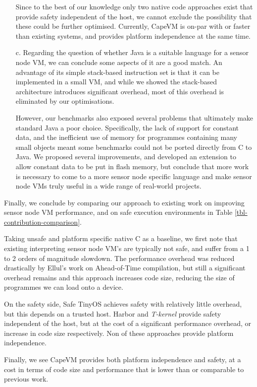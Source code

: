 \begin{enumerate}
	Since to the best of our knowledge only two native code approaches exist that provide safety independent of the host, we cannot exclude the possibility that these could be further optimised. Currently, CapeVM is on-par with or faster than existing systems, and provides platform independence at the same time.

	\item[c.]
	Regarding the question of whether Java is a suitable language for a sensor node VM, we can conclude some aspects of it are a good match. An advantage of its simple stack-based instruction set is that it can be implemented in a small VM, and while we showed the stack-based architecture introduces significant overhead, most of this overhead is eliminated by our optimisations.
	
	However, our benchmarks also exposed several problems that ultimately make standard Java a poor choice. Specifically, the lack of support for constant data, and the inefficient use of memory for programmes containing many small objects meant some benchmarks could not be ported directly from C to Java. We proposed several improvements, and developed an extension to allow constant data to be put in flash memory, but conclude that more work is necessary to come to a more sensor node specific language and make sensor node VMs truly useful in a wide range of real-world projects.
\end{enumerate}



Finally, we conclude by comparing our approach to existing work on improving sensor node VM performance, and on safe execution environments in Table \ref{tbl-contribution-comparison}.

Taking unsafe and platform specific native C as a baseline, we first note that existing interpreting sensor node VM's are typically not safe, and suffer from a 1 to 2 orders of magnitude slowdown. The performance overhead was reduced drastically by Ellul's work on Ahead-of-Time compilation, but still a significant overhead remains and this approach increases code size, reducing the size of programmes we can load onto a device.

On the safety side, Safe TinyOS achieves safety with relatively little overhead, but this depends on a trusted host. Harbor and \emph{T-kernel} provide safety independent of the host, but at the cost of a significant performance overhead, or increase in code size respectively. Non of these approaches provide platform independence.

Finally, we see CapeVM provides both platform independence and safety, at a cost in terms of code size and performance that is lower than or comparable to previous work.
